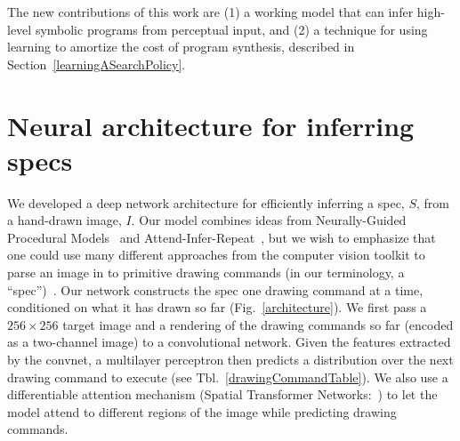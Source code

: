 \documentclass{article}
\theoremstyle{definition}
\begin{document}
 The new contributions of this work are (1) a working model that can infer high-level symbolic programs from perceptual input, and (2) a technique for using learning to amortize the cost of program synthesis, described in Section~\ref{learningASearchPolicy}.

\section{Neural architecture for inferring specs}\label{neuralNetworkSection}

We developed a deep network architecture for efficiently inferring a
spec, $S$, from a hand-drawn image, $I$.
Our model combines ideas from
Neurally-Guided Procedural Models~\citep{ritchie2016neurally}
and Attend-Infer-Repeat~\citep{eslami1603attend}, but
we wish to emphasize
that one could use
many different approaches from the computer vision toolkit to
parse an image in to primitive drawing commands  (in our terminology, a ``spec'')~\cite{nsd}.
Our network constructs the
spec one drawing command at a time, conditioned on what it has drawn so far (Fig.~\ref{architecture}).
We first
pass a $256\times 256$ target image and a rendering of the drawing commands so
far (encoded as a two-channel image) to a convolutional network. Given
the features extracted by the convnet, a multilayer perceptron then
predicts a distribution over the next drawing command to execute
(see Tbl.~\ref{drawingCommandTable}).
We also use a
differentiable attention mechanism (Spatial Transformer
Networks:~\cite{jaderberg2015spatial}) to let the model attend to
different regions of the image while predicting drawing commands.
\end{document}
